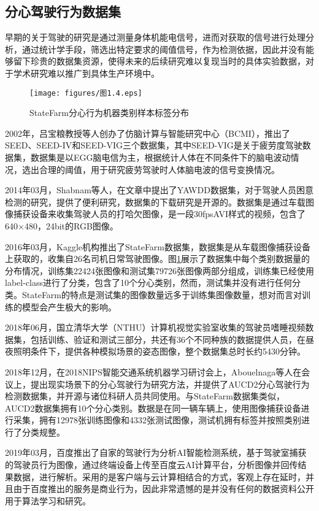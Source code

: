 \subsection{分心驾驶行为数据集}

早期的关于驾驶的研究是通过测量身体机能电信号，进而对获取的信号进行处理分析，通过统计学手段，筛选出特定要求的阈值信号，作为检测依据，因此并没有能够留下珍贵的数据集资源，使得未来的后续研究难以复现当时的具体实验数据，对于学术研究难以推广到具体生产环境中。
	
\begin{figure}[!h]
	\centering
	\texttt{[image: figures/图1.4.eps]}\\
	\caption{StateFarm分心行为机器类别样本标签分布}\label{图1.4}
\end{figure}

2002年，吕宝粮教授等人创办了仿脑计算与智能研究中心（BCMI），推出了SEED、SEED-IV和SEED-VIG三个数据集，其中SEED-VIG是关于疲劳度驾驶数据集，数据集是以EGG脑电信为主，根据统计人体在不同条件下的脑电波动情况，选出合理的阈值，用于研究疲劳驾驶时人体脑电波的信号变换情况。

2014年03月，Shabnam等人\cite{35}，在文章中提出了YAWDD数据集，对于驾驶人员困意检测的研究，提供了便利研究，数据集的下载研究是开源的。数据集是通过车载图像捕获设备来收集驾驶人员的打哈欠图像，是一段30fpsAVI样式的视频，包含了640×480，24bit的RGB图像。

2016年03月，Kaggle机构推出了StateFarm数据集\cite{36}，数据集是从车载图像捕获设备上获取的，收集自26名司机日常驾驶图像。图\ref{图1.4}展示了数据集中每个类别数据量的分布情况，训练集22424张图像和测试集79726张图像两部分组成，训练集已经使用label-class进行了分类，包含了10个分心类别，然而，测试集并没有进行任何分类。StateFarm的特点是测试集的图像数量远多于训练集图像数量，想对而言对训练的模型会产生极大的影响。

2018年06月，国立清华大学（NTHU）计算机视觉实验室收集的驾驶员嗜睡视频数据集，包括训练、验证和测试三部分，共还有36个不同种族的数据提供人员，在昼夜照明条件下，提供各种模拟场景的姿态图像，整个数据集总时长约5430分钟。

2018年12月，在2018NIPS智能交通系统机器学习研讨会上，Abouelnaga等人\cite{37}在会议上，提出现实场景下的分心驾驶行为研究方法，并提供了AUCD2分心驾驶行为检测数据集，并开源与诸位科研人员共同使用。与StateFarm数据集类似，AUCD2数据集拥有10个分心类别。数据是在同一辆车辆上，使用图像捕获设备进行采集，拥有12978张训练图像和4332张测试图像，测试机拥有标签并按照类别进行了分类规整。

2019年03月，百度推出了自家的驾驶行为分析AI智能检测系统，基于驾驶室捕获的驾驶员行为图像，通过终端设备上传至百度云AI计算平台，分析图像并回传结果数据，进行解析。采用的是客户端与云计算相结合的方式，客观上存在延时，并且由于百度推出的服务是商业行为，因此非常遗憾的是并没有任何的数据资料公开用于算法学习和研究。

